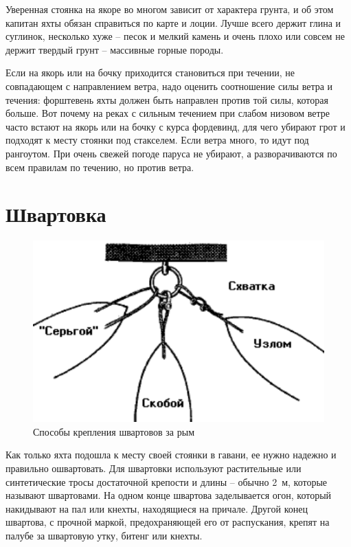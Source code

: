 \documentclass[a4paper, 12pt, twoside, final]{scrbook}
\begin{document}
Уверенная стоянка на якоре во многом зависит от характера грунта, и об этом капитан яхты обязан справиться по карте и лоции. Лучше всего держит глина и суглинок, несколько хуже \--- песок и мелкий камень и очень плохо или совсем не держит твердый грунт \--- массивные горные породы.

Если на якорь или на бочку приходится становиться при течении, не совпадающем с направлением ветра, надо оценить соотношение силы ветра и течения: форштевень яхты должен быть направлен против той силы, которая больше. Вот почему на реках с сильным течением при слабом низовом ветре часто встают на якорь или на бочку с курса фордевинд, для чего убирают грот и подходят к месту стоянки под стакселем. Если ветра много, то идут под рангоутом. При очень свежей погоде паруса не убирают, а разворачиваются по всем правилам по течению, но против ветра.

\section{Швартовка}

\begin{figure}
	\centering
	\includegraphics[scale=1]{130_Kreplenie_za_rym}
	\caption{Способы крепления швартовов за рым}
	\label{fig:130}
\end{figure}

Как только яхта подошла к месту своей стоянки в гавани, ее нужно надежно и правильно ошвартовать. Для швартовки используют растительные или синтетические тросы достаточной крепости и длины \--- обычно 2~м, которые называют швартовами. На одном конце швартова заделывается огон, который накидывают на пал или кнехты, находящиеся на причале. Другой конец швартова, с прочной маркой, предохраняющей его от распускания, крепят на палубе за швартовую утку, битенг или кнехты.
\end{document}
